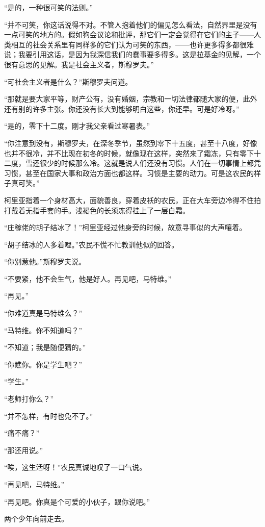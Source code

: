 \par “是的，一种很可笑的法则。”
\par “并不可笑，你这话说得不对。不管人抱着他们的偏见怎么看法，自然界里是没有一点可笑的地方的。假如狗会议论和批评，那它们一定会觉得在它们的主子——人类相互的社会关系里有同样多的它们认为可笑的东西，——也许更多得多都很难说；我要引用这话，是因为我深信我们的蠢事要多得多。这是拉基金的见解，一个很有意思的见解。我是社会主义者，斯穆罗夫。”
\par “可社会主义者是什么？”斯穆罗夫问道。
\par “那就是要大家平等，财产公有，没有婚姻，宗教和一切法律都随大家的便，此外还有别的许多主张。你还没有长大到能够明白这些，你还早。可是好冷呀。”
\par “是的，零下十二度。刚才我父亲看过寒暑表。”
\par “你注意到没有，斯穆罗夫，在深冬季节，虽然到零下十五度，甚至十八度，好像也并不很冷，并不比现在初冬的时候，就像现在这样，突然来了霜冻，只有零下十二度，雪还很少的时候那么冷。这就是说人们还没有习惯。人们在一切事情上都凭习惯，甚至在国家大事和政治方面也都这样。习惯是主要的动力。可是这农民的样子真可笑。”
\par 柯里亚指着一个身材高大，面貌善良，穿着皮袄的农民，正在大车旁边冷得不住拍打戴着无指手套的手。浅褐色的长须冻得挂上了一层白霜。
\par “庄稼佬的胡子结冰了！”柯里亚经过他身旁的时候，故意寻事似的大声嚷着。
\par “胡子结冰的人多着哩。”农民不慌不忙教训他似的回答。
\par “你别惹他。”斯穆罗夫说。
\par “不要紧，他不会生气，他是好人。再见吧，马特维。”
\par “再见。”
\par “你难道真是马特维么？”
\par “马特维。你不知道吗？”
\par “不知道；我是随便猜的。”
\par “你瞧你。你是学生吧？”
\par “学生。”
\par “老师打你么？”
\par “并不怎样，有时也免不了。”
\par “痛不痛？”
\par “那还用说。”
\par “唉，这生活呀！”农民真诚地叹了一口气说。
\par “再见吧，马特维。”
\par “再见吧。你真是个可爱的小伙子，跟你说吧。”
\par 两个少年向前走去。
